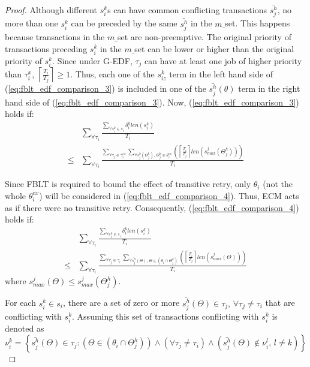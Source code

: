 \documentclass[a4paper,english]{article}
\newtheorem{proof}{Proof}
\begin{document}
\begin{proof}
Although different $s_{i}^{k}$s can have common conflicting transactions
$\bar{s_{j}^{h}}$, no more than one $s_{i}^{k}$ can be preceded
by the same $\bar{s_{j}^{h}}$ in the $m\_$set. This happens because
transactions in the $m\_$set are non-preemptive. The original priority
of transactions preceding $s_{i}^{k}$ in the $m\_$set can be 
lower or higher than the original priority of $s_{i}^{k}$. Since under
G-EDF, $\tau_{j}$ can have at least one job of higher
priority than $\tau_{i}^{x}$, $\left\lceil \frac{T_{i}}{T_{j}}\right\rceil \ge1$.
Thus, each one of the $s_{iz}^{k}$ term in the left hand side of (\ref{eq:fblt_edf_comparison_3})
is included in one of the $\bar{s_{j}^{h}}(\theta)$ term in the right hand side of (\ref{eq:fblt_edf_comparison_3}). 
%
Now, (\ref{eq:fblt_edf_comparison_3}) holds if:
\begin{eqnarray}
 & \sum_{\forall\tau_{i}}\frac{\sum_{\forall s_{i}^{k}\in s_{i}}\delta_i^klen(s_{i}^{k})}{T_{i}}\label{eq:fblt_edf_comparison_4}\\
\le &
\sum_{\forall\tau_{i}}\frac{\sum_{\forall\tau_{j}\in\gamma_{i}^{ex}}\sum_{\forall \bar{s_{j}^{h}}(\Theta_j^h),\,\Theta_j^h\in\theta_{i}^{ex}}\left(\left\lceil \frac{T_{i}}{T_{j}}\right\rceil len\left(s_{max}^{j}(\Theta_j^h)\right)\right)}{T_{i}}\nonumber 
\end{eqnarray}

Since FBLT is required to bound the effect of transitive retry, only $\theta_i$ (not the whole $\theta_i^{ex}$) will be considered in (\ref{eq:fblt_edf_comparison_4}). Thus, ECM acts as if there were no transitive retry. Consequently, (\ref{eq:fblt_edf_comparison_4}) holds if:
\begin{eqnarray}
 & \sum_{\forall\tau_{i}}\frac{\sum_{\forall s_{i}^{k}\in s_{i}}\delta_i^klen(s_{i}^{k})}{T_{i}}\label{eq:fblt_edf_comparison_4_1}\\
\le &
\sum_{\forall\tau_{i}}\frac{\sum_{\forall\tau_{j}\in\gamma_{i}}\sum_{\forall \bar{s_{j}^{h}}(\Theta),\,\Theta\in(\theta_{i}\cap\Theta_j^h)}\left(\left\lceil \frac{T_{i}}{T_{j}}\right\rceil len\left(s_{max}^{j}(\Theta)\right)\right)}{T_{i}}\nonumber 
\end{eqnarray}
where $s_{max}^j(\Theta) \le s_{max}^j(\Theta_j^h)$. 

For each $s_{i}^{k}\in s_{i}$, there are a set of zero or more $\bar{s_{j}^{h}}(\Theta)\in\tau_{j},\,\forall\tau_{j}\ne\tau_{i}$
that are conflicting with $s_{i}^{k}$. Assuming this set of transactions conflicting with $s_{i}^{k}$ is denoted as \[\nu_{i}^{k}=\left\{ \bar{s_{j}^{h}}(\Theta)\in\tau_{j}:\left(\Theta\in(\theta_{i}\cap\Theta_j^h)\right)\wedge\left(\forall\tau_{j}\ne\tau_{i}\right)\wedge\left(\bar{s_{j}^{h}}(\Theta)\not\in\nu_{i}^{l},\, l\ne k\right)\right\} \]



\end{proof}
\end{document}
